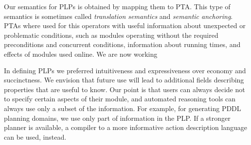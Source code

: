 \documentclass[letterpaper]{article}
\begin{document}
{Our semantics for PLPs is obtained by mapping them to PTA. This type of semantics is sometimes called {\em translation semantics\/} and {\em semantic anchoring}.
PTAs where used for this operators with useful information about unexpected or problematic conditions, such as modules operating without the required preconditions and concurrent conditions, information about running times, and effects of modules used online. We are now working

In defining PLPs we preferred intuitiveness and expressiveness over economy and succinctness. We envision that future use will lead to additional fields describing properties that are useful to know.
Our point is that users can always decide not to specify certain aspects of their module, and automated reasoning tools can always use only a subset of the information. For example, for generating PDDL planning domains, we use only part of information in the PLP. If a stronger planner is available, a compiler to a more informative action description language can be used, instead.
}


\end{document}
